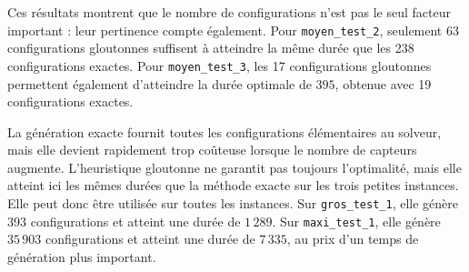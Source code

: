 \documentclass[10pt,a4paper]{article}
\begin{document}
Ces résultats montrent que le nombre de configurations n'est pas le seul facteur important : leur pertinence compte également. Pour \texttt{moyen\_test\_2}, seulement 63 configurations gloutonnes suffisent à atteindre la même durée que les 238 configurations exactes. Pour \texttt{moyen\_test\_3}, les 17 configurations gloutonnes permettent également d'atteindre la durée optimale de $395$, obtenue avec 19 configurations exactes.

La génération exacte fournit toutes les configurations élémentaires au solveur, mais elle devient rapidement trop coûteuse lorsque le nombre de capteurs augmente. L'heuristique gloutonne ne garantit pas toujours l'optimalité, mais elle atteint ici les mêmes durées que la méthode exacte sur les trois petites instances. Elle peut donc être utilisée sur toutes les instances. Sur \texttt{gros\_test\_1}, elle génère 393 configurations et atteint une durée de $1\,289$. Sur \texttt{maxi\_test\_1}, elle génère $35\,903$ configurations et atteint une durée de $7\,335$, au prix d'un temps de génération plus important.
\end{document}
